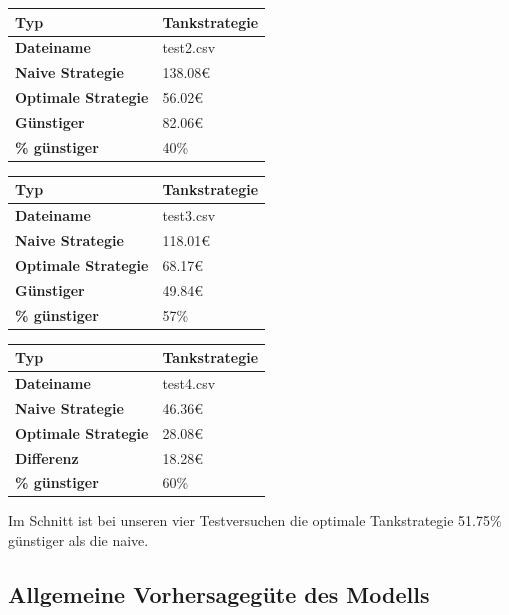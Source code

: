 \documentclass[
ngerman          %
,a4paper          %
,11pt
,pdftex
]{report}
\begin{document}
\begin{table}[H]
	\centering
	\begin{tabular}{l l}
		\textbf{Typ} & Tankstrategie \\ 
		\hline
		\hline
		\textbf{Dateiname} & test2.csv \\
        \textbf{Naive Strategie} & 138.08\euro{} \\
        \textbf{Optimale Strategie} & 56.02\euro{} \\
  		\textbf{Günstiger} & 82.06\euro{} \\
        \textbf{\% günstiger} & 40\% \\
		\hline 
	\end{tabular}
\end{table} 

\begin{table}[H]
	\centering
	\begin{tabular}{l l}
		\textbf{Typ} & Tankstrategie \\ 
		\hline
		\hline
		\textbf{Dateiname} & test3.csv \\
        \textbf{Naive Strategie} & 118.01\euro{} \\
        \textbf{Optimale Strategie} & 68.17\euro{} \\
  		\textbf{Günstiger} & 49.84\euro{} \\
        \textbf{\% günstiger} & 57\% \\
		\hline 
	\end{tabular}
\end{table} 

\begin{table}[H]
	\centering
	\begin{tabular}{l l}
		\textbf{Typ} & Tankstrategie \\ 
		\hline
		\hline
		\textbf{Dateiname} & test4.csv \\
        \textbf{Naive Strategie} & 46.36\euro{} \\
        \textbf{Optimale Strategie} & 28.08\euro{} \\
  		\textbf{Differenz} & 18.28\euro{} \\
        \textbf{\% günstiger} & 60\% \\
		\hline 
	\end{tabular}
\end{table} 

Im Schnitt ist bei unseren vier Testversuchen die optimale Tankstrategie 51.75\% günstiger als die naive.

\subsection{Allgemeine Vorhersagegüte des Modells}
\end{document}
